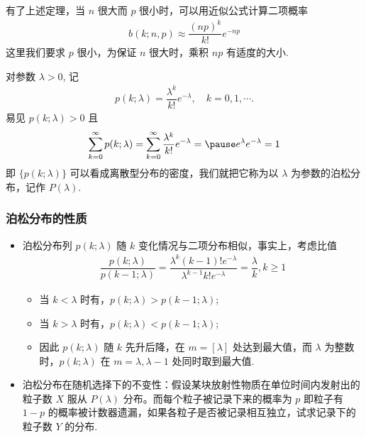 \documentclass[Prob-All.tex]{subfiles}
\begin{document}
\begin{frame}
	有了上述定理，当 $n$ 很大而 $p$ 很小时，可以用近似公式计算二项概率
	\begin{eqnarray*}
		b(k;n,p)\approx \dfrac{(np)^k}{k!}e^{-np}
	\end{eqnarray*}
	这里我们要求 $p$ 很小，为保证 $n$ 很大时，乘积 $np$ 有适度的大小.

	\pause  \begin{defi}[泊松分布] 对参数 $\lambda>0$, 记
		\begin{eqnarray*}
			p(k;\lambda)=\dfrac{\lambda^k}{k!}e^{-\lambda}, \quad k=0, 1,\cdots.
		\end{eqnarray*}
		\pause 易见 $p (k;\lambda)>0$ 且
		\begin{eqnarray*}
			\sum_{k=0}^\infty p(k;\lambda)=\sum_{k=0}^\infty \dfrac{\lambda^k}{k!}e^{-\lambda}=\pause e^\lambda e^{-\lambda}=1
		\end{eqnarray*}
		\pause 即 $\{p (k;\lambda)\}$ 可以看成离散型分布的密度，我们就把它称为以 $\lambda$ 为参数的泊松分布，记作 $P (\lambda)$.
	\end{defi}
\end{frame}
\begin{frame}
	\frametitle{泊松分布的性质}
	\begin{itemize}[<+-|alert@+>]
		\item 泊松分布列 $p (k;\lambda)$ 随 $k$ 变化情况与二项分布相似，事实上，考虑比值
		      \begin{eqnarray*}
			      \dfrac{p(k;\lambda)}{p(k-1;\lambda)}=\dfrac{\lambda^k(k-1)!e^{-\lambda}}{\lambda^{k-1}k!e^{-\lambda}}=\dfrac{\lambda}{k}, k\ge 1
		      \end{eqnarray*}
		      \begin{itemize}
			      \item 当 $k<\lambda$ 时有，$p (k;\lambda)>p (k-1;\lambda)$;
			      \item 当 $k>\lambda$ 时有，$p (k;\lambda)<p (k-1;\lambda)$;
			      \item 因此 $p (k;\lambda)$ 随 $k$ 先升后降，在 $m=[\lambda]$ 处达到最大值，而 $\lambda$ 为整数时，$p (k;\lambda)$ 在 $m=\lambda,\lambda-1$ 处同时取到最大值.
		      \end{itemize}
		\item 泊松分布在随机选择下的不变性：假设某块放射性物质在单位时间内发射出的粒子数 $X$ 服从 $P (\lambda)$ 分布。而每个粒子被记录下来的概率为 $p$ 即粒子有 $1-p$ 的概率被计数器遗漏，如果各粒子是否被记录相互独立，试求记录下的粒子数 $Y$ 的分布.
	\end{itemize}
\end{frame}
\end{document}

